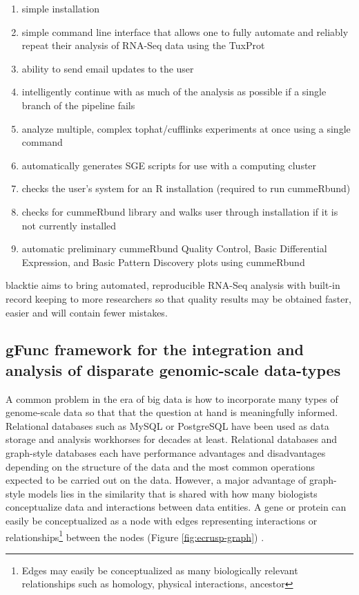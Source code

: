 \begin{enumerate}
    \item simple installation
    \item simple command line interface that allows one to fully automate and reliably repeat their analysis of \gls{RNA-Seq} data using the \gls{TuxProt}
    \item ability to send email updates to the user
    \item intelligently continue with as much of the analysis as possible if a single branch of the pipeline fails
    \item analyze multiple, complex \gls{tophat}/\gls{cufflinks} experiments at once using a single command
    \item automatically generates \gls{SGE} scripts for use with a computing cluster
    \item checks the user's system for an R installation (required to run \gls{cummeRbund})
    \item checks for \gls{cummeRbund} library and walks user through installation if it is not currently installed
    \item automatic preliminary  \gls{cummeRbund} Quality Control, Basic Differential Expression, and Basic Pattern Discovery plots using cummeRbund
\end{enumerate}



\gls{blacktie} aims to bring automated, reproducible \gls{RNA-Seq} analysis with built-in record keeping to more researchers so that quality results may be obtained faster, easier and will contain fewer mistakes.



\subsection{gFunc framework for the integration and analysis of disparate genomic-scale data-types}

A common problem in the era of big data is how to incorporate many types of genome-scale data so that that the question at hand is meaningfully informed.
Relational databases such as MySQL or PostgreSQL have been used as data storage and analysis workhorses for decades at least.
Relational databases and graph-style databases each have performance advantages and disadvantages depending on the structure of the data and the most common operations expected to be carried out on the data.
However, a major advantage of graph-style models lies in the similarity that is shared with how many biologists conceptualize data and interactions between data entities.
A gene or protein can easily be conceptualized as a node with edges representing interactions or relationships\footnote{Edges may easily be conceptualized as many biologically relevant relationships such as homology, physical interactions, ancestor} between the nodes (Figure \ref{fig:ecrusp-graph}) \cite{Franceschini2013}.



